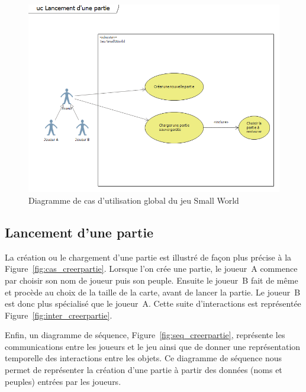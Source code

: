 \documentclass[a4paper]{article}%
\begin{document}
\begin{figure}[H]
    \centering
    \includegraphics[width=\textwidth]{./images/cas_dutilisation/jeuglobal.png}
		\caption{Diagramme de cas d'utilisation global du jeu Small World}
		\label{fig:jeuglobal}
\end{figure}

\subsection{Lancement d'une partie}

La création ou le chargement d'une partie est illustré de façon plus précise à la Figure~\ref{fig:cas_creerpartie}.
Lorsque l'on crée une partie, le joueur~A commence par choisir son nom de joueur puis son peuple. Ensuite le joueur~B fait de même et procède au choix de la taille de la carte, avant de lancer la partie. Le joueur~B est donc plus spécialisé que le joueur~A. Cette suite d'interactions est représentée Figure~\ref{fig:inter_creerpartie}.

Enfin, un diagramme de séquence, Figure~\ref{fig:seq_creerpartie}, représente les communications entre les joueurs et le jeu ainsi que de donner une représentation temporelle des interactions entre les objets. Ce diagramme de séquence nous permet de représenter la création d'une partie à partir des données (noms et peuples) entrées par les joueurs.
\end{document}
